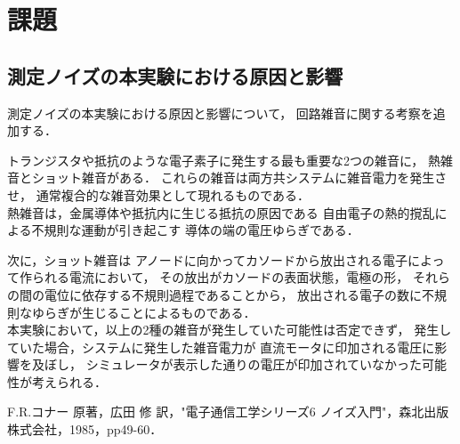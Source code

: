 \documentclass[11pt,a4paper]{jsarticle}
\begin{document}
\setcounter{section}{5}
\section{課題}

\subsection{測定ノイズの本実験における原因と影響}

測定ノイズの本実験における原因と影響について，
回路雑音に関する考察を追加する．

トランジスタや抵抗のような電子素子に発生する最も重要な2つの雑音に，
熱雑音とショット雑音がある．
これらの雑音は両方共システムに雑音電力を発生させ，
通常複合的な雑音効果として現れるものである．\\

熱雑音は，金属導体や抵抗内に生じる抵抗の原因である
自由電子の熱的撹乱による不規則な運動が引き起こす
導体の端の電圧ゆらぎである．

次に，ショット雑音は
アノードに向かってカソードから放出される電子によって作られる電流において，
その放出がカソードの表面状態，電極の形，
それらの間の電位に依存する不規則過程であることから，
放出される電子の数に不規則なゆらぎが生じることによるものである．\\

本実験において，以上の2種の雑音が発生していた可能性は否定できず，
発生していた場合，システムに発生した雑音電力が
直流モータに印加される電圧に影響を及ぼし，
シミュレータが表示した通りの電圧が印加されていなかった可能性が考えられる．

\begin{thebibliography}{9}
  \item F.R.コナー 原著，広田 修 訳，"電子通信工学シリーズ6 ノイズ入門"，森北出版株式会社，1985，pp49-60．
\end{thebibliography}
\end{document}

